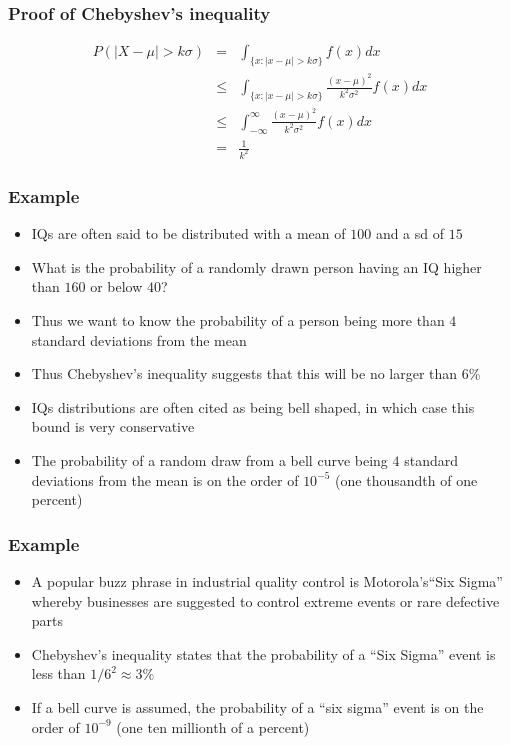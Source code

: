 \documentclass[aspectratio=169]{beamer}
\begin{document}
\begin{frame} \frametitle{Proof of Chebyshev's inequality}
  \begin{eqnarray*}
    P(|X - \mu| > k\sigma) & = & \int_{\{x: |x-\mu| > k\sigma\}} f(x) dx \\
& \leq & \int_{\{x:|x -\mu| > k\sigma\}}\frac{(x - \mu)^2}{k^2\sigma^2} f(x) dx \\
& \leq & \int_{-\infty}^{\infty} \frac{(x - \mu)^2}{k^2\sigma^2} f(x) dx \\
& = & \frac{1}{k^2}
  \end{eqnarray*}
\end{frame}

\begin{frame} \frametitle{Example}
  \begin{itemize}
  \item IQs are often said to be distributed with a mean of $100$ and a sd of $15$
  \item What is the probability of a randomly drawn person having an IQ higher than
    $160$ or below $40$?
  \item Thus we want to know the probability of a person being more
    than $4$ standard deviations from the mean
  \item Thus Chebyshev's inequality suggests that this will be no larger than 6\%
  \item IQs distributions are often cited as being bell shaped, in which case this
    bound is very conservative
  \item The probability of a random draw from a bell curve being $4$
    standard deviations from the mean is on the order of $10^{-5}$ (one
    thousandth of one percent)
  \end{itemize}
\end{frame}

\begin{frame} \frametitle{Example}
  \begin{itemize}
  \item A popular buzz phrase in industrial quality control is
    Motorola's``Six Sigma'' whereby businesses are suggested to
    control extreme events or rare defective parts
  \item Chebyshev's inequality states that the probability of a ``Six
    Sigma'' event is less than $1/6^2 \approx 3\%$
  \item If a bell curve is assumed, the probability of a ``six sigma''
    event is on the order of $10^{-9}$ (one ten millionth of a percent)
  \end{itemize}
\end{frame}
\end{document}
